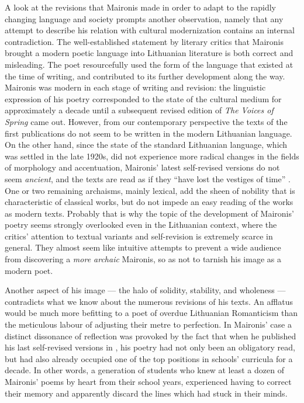 \begin{paper}
A look at the revisions that Maironis made in order to adapt to the
rapidly changing language and society prompts another observation, namely that any attempt to describe his relation with cultural modernization contains
an internal contradiction. The well-established statement by literary critics
that Maironis brought a modern poetic language into Lithuanian
literature \citep[286]{nyka-niliunas_maironio_1962} is both correct and misleading. The
poet resourcefully used the form of the language that existed at the
time of writing, and contributed to its further development along the way. Maironis was
modern in each stage of writing and revision: the linguistic expression
of his poetry corresponded to the state of the cultural medium for
approximately a decade until a subsequent revised edition of \emph{The
Voices of Spring} came out. However, from our contemporary perspective
the texts of the first publications do not seem to be written in the
modern Lithuanian language. On the other hand, since the state of the
standard Lithuanian language, which was settled in the late 1920s, did
not experience more radical changes in the fields of morphology and
accentuation, Maironis' latest self-revised versions do not seem
\emph{ancient}, and the texts are read as if they ``have lost the vestiges of time''
\citep[37]{zvirgzdas_po_2012}. One or two remaining archaisms, mainly lexical,
add the sheen of nobility that is characteristic of classical works, but do not
impede an easy reading of the works as modern texts. Probably that is
why the topic of the development of Maironis' poetry seems strongly
overlooked even in the Lithuanian context, where the critics' attention
to textual variants and self-revision is extremely scarce in general. They almost
seem like intuitive attempts to prevent a wide audience from discovering a \emph{more archaic} Maironis, so as not to tarnish his
image as a modern poet.

Another aspect of his image --- the halo of solidity, stability, and
wholeness \citep[cf.][15]{slavinskaite_maironis_1987} --- contradicts what we know
about the numerous revisions of his texts. An afflatus would be much
more befitting to a poet of overdue Lithuanian Romanticism than the
meticulous labour of adjusting their metre to perfection. In
Maironis' case a distinct dissonance of reflection was provoked by the
fact that when he published his last self-revised versions in \citeyear{maironis_maironio_1927}, his
poetry had not only been an obligatory read, but had also already occupied one of the top
positions in schools' curricula for a decade. In other words,
a generation of students who knew at least a dozen of Maironis' poems
by heart from their school years, experienced having to
correct their memory and apparently discard the lines which had stuck in
their minds.


\end{paper}

